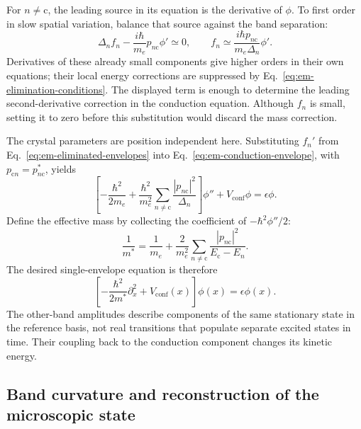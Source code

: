 For $n\ne\mathrm c$, the leading source in its equation is
the derivative of $\phi$. To first order in slow spatial
variation, balance that source against the band separation:
\begin{equation}
  \Delta_nf_n-\frac{i\hbar}{m_e}p_{n\mathrm c}\phi'\simeq0,
  \qquad
  f_n\simeq\frac{i\hbar p_{n\mathrm c}}{m_e\Delta_n}\phi'.
  \label{eq:em-eliminated-envelopes}
\end{equation}
Derivatives of these already small components give higher
orders in their own equations; their local energy corrections
are suppressed by Eq.~\eqref{eq:em-elimination-conditions}.
The displayed term is enough to determine the leading
second-derivative correction in the conduction equation.
Although $f_n$ is small, setting it to zero before this
substitution would discard the mass correction.

The crystal parameters are position independent here. Substituting
$f_n'$ from Eq.~\eqref{eq:em-eliminated-envelopes} into
Eq.~\eqref{eq:em-conduction-envelope}, with
$p_{\mathrm c n}=p_{n\mathrm c}^*$, yields
\begin{equation}
  \left[-\frac{\hbar^2}{2m_e}
       +\frac{\hbar^2}{m_e^2}\sum_{n\ne\mathrm c}
                 \frac{|p_{n\mathrm c}|^2}{\Delta_n}\right]\phi''
       +V_{\mathrm{conf}}\phi=\epsilon\phi.
  \label{eq:em-mass-before-definition}
\end{equation}
Define the effective mass by collecting the coefficient of
$-\hbar^2\phi''/2$:
\begin{equation}
  \boxed{\frac1{m^*}=\frac1{m_e}
      +\frac{2}{m_e^2}\sum_{n\ne\mathrm c}
                    \frac{|p_{n\mathrm c}|^2}{E_{\mathrm c}-E_n}}.
  \label{eq:em-mass-sum}
\end{equation}
The desired single-envelope equation is therefore
\begin{equation}
  \boxed{\left[-\frac{\hbar^2}{2m^*}\partial_x^2
           +V_{\mathrm{conf}}(x)\right]\phi(x)
          =\epsilon\phi(x)}.
  \label{eq:em-effective-equation}
\end{equation}
The other-band amplitudes describe components of the same
stationary state in the reference basis, not real transitions
that populate separate excited states in time. Their coupling
back to the conduction component changes its kinetic energy.

\subsection{Band curvature and reconstruction of the microscopic state}
\label{sec:em-curvature-reconstruction}

